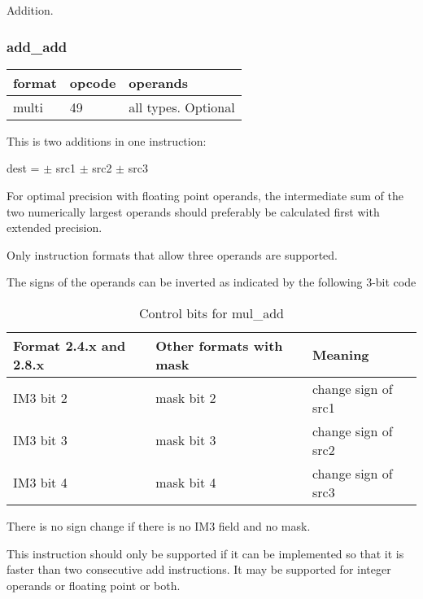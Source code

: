 \documentclass[forwardcom.tex]{subfiles}
\begin{document}
Addition.

\subsubsection{add\_add}
\label{table:addAddInstruction}
\begin{tabular}{|p{12mm}|p{12mm}|p{110mm}|}
\hline
\bfseries format & \bfseries opcode & \bfseries operands \\ \hline
multi & 49 & all types. Optional \\ \hline
\end{tabular}
\vspace{3mm}

This is two additions in one instruction:
\vspace{2mm}

dest = $\pm$ src1 $\pm$ src2 $\pm$ src3
\vspace{2mm}

For optimal precision with floating point operands, the intermediate sum of the two numerically largest operands should preferably be calculated first with extended precision.
\vspace{2mm}

Only instruction formats that allow three operands are supported.
\vspace{2mm}

The signs of the operands can be inverted as indicated by the following 3-bit code

\begin{longtable} {|p{20mm}|p{20mm}|p{75mm}|}
\caption{Control bits for mul\_add} 
\label{table:ControlBitsForAddAdd} \\
\endfirsthead
\endhead
\hline
\bfseries Format 2.4.x and 2.8.x & \bfseries Other formats with mask & \bfseries Meaning   \\
\hline
IM3 bit 2 & mask bit 2 & change sign of src1 \\
IM3 bit 3 & mask bit 3 & change sign of src2 \\
IM3 bit 4 & mask bit 4 & change sign of src3 \\
\hline
\end{longtable}

There is no sign change if there is no IM3 field and no mask. 
\vspace{2mm}

This instruction should only be supported if it can be implemented so that it is faster than two consecutive add instructions. It may be supported for integer operands or floating point or both.
\end{document}

